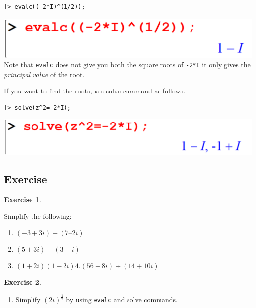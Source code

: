 \documentclass[
]{book}
\providecommand{\tightlist}{%
  \setlength{\itemsep}{0pt}\setlength{\parskip}{0pt}}
\theoremstyle{definition}
\theoremstyle{definition}
\theoremstyle{definition}
\newtheorem{exercise}{Exercise}[chapter]
\theoremstyle{definition}
\theoremstyle{remark}
\begin{document}
\begin{verbatim}
[> evalc((-2*I)^(1/2));
\end{verbatim}

\includegraphics{figures/Lesson 1/fig47.png}
Note that \texttt{evalc} does not give you both the square roots of \texttt{-2*I} it only gives the \emph{principal value} of the root.

If you want to find the roots, use solve command as follows.

\begin{verbatim}
[> solve(z^2=-2*I);
\end{verbatim}

\includegraphics{figures/Lesson 1/fig48.png}

\subsection{Exercise}\label{exercise-12}

\begin{exercise}
\protect\hypertarget{exr:unnamed-chunk-70}{}\label{exr:unnamed-chunk-70}

Simplify the following:

\begin{enumerate}
\def\labelenumi{\arabic{enumi}.}
\tightlist
\item
  \((−3 + 3i) + (7 – 2i)\)
\item
  \((5 + 3i) − (3 − i)\)
\item
  \((1 + 2i)(1 − 2i) 4. (56 − 8i) ÷ (14 + 10i)\)
\end{enumerate}

\end{exercise}

\begin{exercise}
\protect\hypertarget{exr:unnamed-chunk-71}{}\label{exr:unnamed-chunk-71}\leavevmode

\begin{enumerate}
\def\labelenumi{\arabic{enumi}.}
\setcounter{enumi}{1}
\tightlist
\item
  Simplify \((2i)^\frac{1}{2}\) by using \texttt{evalc} and solve commands.
\end{enumerate}

\end{exercise}
\end{document}
